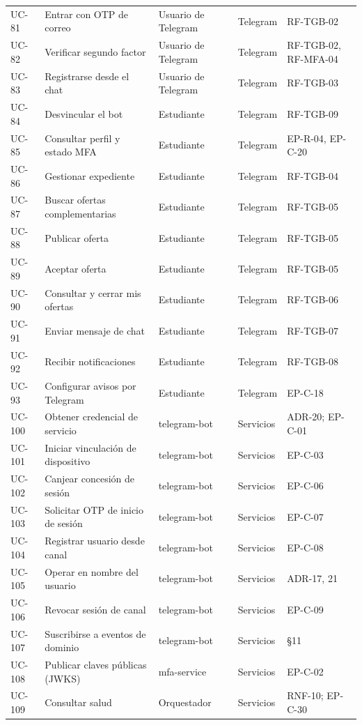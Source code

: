 \documentclass[11pt,a4paper]{report}
\begin{document}
\begin{center}
\begin{longtable}{@{}lp{6.0cm}p{3.2cm}p{1.7cm}p{3.0cm}@{}}
UC-81 & Entrar con OTP de correo & Usuario de Telegram & Telegram & RF-TGB-02\\
UC-82 & Verificar segundo factor & Usuario de Telegram & Telegram & RF-TGB-02, RF-MFA-04\\
UC-83 & Registrarse desde el chat & Usuario de Telegram & Telegram & RF-TGB-03\\
UC-84 & Desvincular el bot & Estudiante & Telegram & RF-TGB-09\\
UC-85 & Consultar perfil y estado MFA & Estudiante & Telegram & EP-R-04, EP-C-20\\
UC-86 & Gestionar expediente & Estudiante & Telegram & RF-TGB-04\\
UC-87 & Buscar ofertas complementarias & Estudiante & Telegram & RF-TGB-05\\
UC-88 & Publicar oferta & Estudiante & Telegram & RF-TGB-05\\
UC-89 & Aceptar oferta & Estudiante & Telegram & RF-TGB-05\\
UC-90 & Consultar y cerrar mis ofertas & Estudiante & Telegram & RF-TGB-06\\
UC-91 & Enviar mensaje de chat & Estudiante & Telegram & RF-TGB-07\\
UC-92 & Recibir notificaciones & Estudiante & Telegram & RF-TGB-08\\
UC-93 & Configurar avisos por Telegram & Estudiante & Telegram & EP-C-18\\
UC-100 & Obtener credencial de servicio & telegram-bot & Servicios & ADR-20; EP-C-01\\
UC-101 & Iniciar vinculación de dispositivo & telegram-bot & Servicios & EP-C-03\\
UC-102 & Canjear concesión de sesión & telegram-bot & Servicios & EP-C-06\\
UC-103 & Solicitar OTP de inicio de sesión & telegram-bot & Servicios & EP-C-07\\
UC-104 & Registrar usuario desde canal & telegram-bot & Servicios & EP-C-08\\
UC-105 & Operar en nombre del usuario & telegram-bot & Servicios & ADR-17, 21\\
UC-106 & Revocar sesión de canal & telegram-bot & Servicios & EP-C-09\\
UC-107 & Suscribirse a eventos de dominio & telegram-bot & Servicios & \S{}11\\
UC-108 & Publicar claves públicas (JWKS) & mfa-service & Servicios & EP-C-02\\
UC-109 & Consultar salud & Orquestador & Servicios & RNF-10; EP-C-30\\
\bottomrule
\end{longtable}
\end{center}
\end{document}
